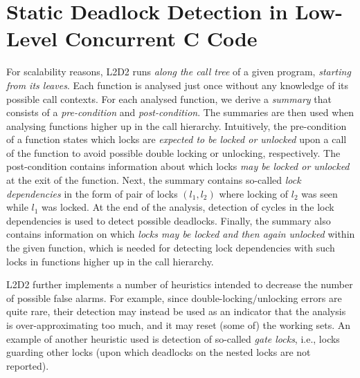 \documentclass[runningheads]{llncs}
\begin{document}
\vspace*{-3.5mm}\section{Static Deadlock Detection in Low-Level Concurrent C
Code}\vspace*{-2mm}

For scalability reasons, L2D2 runs \emph{along the call tree} of a given
program, \emph{starting from its leaves}.
%
Each function is analysed just once without any knowledge of its possible call
contexts.
%
For each analysed function, we derive a \emph{summary} that consists of a
\emph{pre-condition} and \emph{post-condition}.
%
The summaries are then used when analysing functions higher up in the call
hierarchy.
%
%
%
Intuitively, the pre-condition of a function states which locks are
\emph{expected to be locked or unlocked} upon a call of the function to avoid
possible double locking or unlocking, respectively.
%
The post-condition contains information about which locks \emph{may be locked or
unlocked} at the exit of the function.
%
Next, the summary contains so-called \emph{lock dependencies} in the form of
pair of locks $(l_1,l_2)$ where locking of $l_2$ was seen while $l_1$ was
locked.
%
At the end of the analysis, detection of cycles in the lock dependencies is used
to detect possible deadlocks.
%
Finally, the summary also contains information on which \emph{locks may be
locked and then again unlocked} within the given function, which is needed for
detecting lock dependencies with such locks in functions higher up in the call
hierarchy.

L2D2 further implements a number of heuristics intended to decrease the number
of possible false alarms.
%
For example, since double-locking/unlocking errors are quite rare, their
detection may instead be used as an indicator that the analysis is
over-approximating too much, and it may reset (some of) the working sets.
%
An example of another heuristic used is detection of so-called \emph{gate
locks}, i.e., locks guarding other locks (upon which deadlocks on the nested
locks are not reported).
\end{document}
